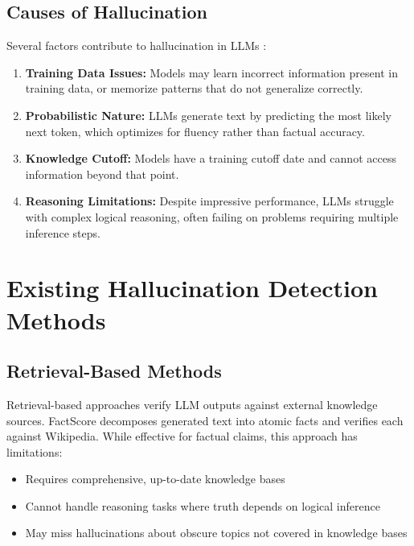 \subsection{Causes of Hallucination}

Several factors contribute to hallucination in LLMs \cite{huang2023survey}:

\begin{enumerate}
    \item \textbf{Training Data Issues:} Models may learn incorrect information present in training data, or memorize patterns that do not generalize correctly.

    \item \textbf{Probabilistic Nature:} LLMs generate text by predicting the most likely next token, which optimizes for fluency rather than factual accuracy.

    \item \textbf{Knowledge Cutoff:} Models have a training cutoff date and cannot access information beyond that point.

    \item \textbf{Reasoning Limitations:} Despite impressive performance, LLMs struggle with complex logical reasoning, often failing on problems requiring multiple inference steps.
\end{enumerate}

\section{Existing Hallucination Detection Methods}

\subsection{Retrieval-Based Methods}

Retrieval-based approaches verify LLM outputs against external knowledge sources. FactScore \cite{min2023factscore} decomposes generated text into atomic facts and verifies each against Wikipedia. While effective for factual claims, this approach has limitations:

\begin{itemize}
    \item Requires comprehensive, up-to-date knowledge bases
    \item Cannot handle reasoning tasks where truth depends on logical inference
    \item May miss hallucinations about obscure topics not covered in knowledge bases
\end{itemize}

